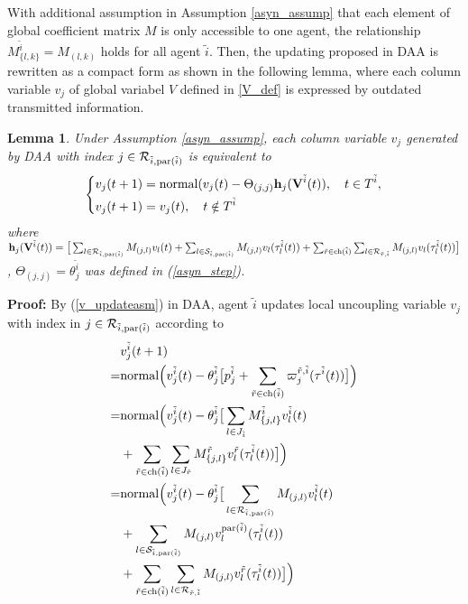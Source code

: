\documentclass[journal]{IEEEtran}
\newtheorem{lemma}{Lemma}[section]
\begin{document}
\par With additional assumption in Assumption \ref{asyn_assump} that each element of global coefficient matrix $M$ is only accessible to one agent, the relationship $M^{\tilde{i}}_{\{l,k\}}=M_{(l,k)}$ holds for all agent $\tilde{i}$. Then, the updating proposed in DAA is rewritten as a compact form as shown in the following lemma, where each column variable $v_j$ of global variabel $V$ defined in \eqref{V_def} is expressed by outdated transmitted information.
\begin{lemma}\label{asyn_comp}
	Under Assumption \ref{asyn_assump}, each column variable $v_j$ generated by DAA with index $j\in \mathcal{R}_{\tilde{i},{\rm par}(\tilde{i})}$ is equivalent to
	\begin{equation}
	\left\{
	\begin{aligned}
	&v_j(t+1)={\rm normal}(v_j(t)-\Theta_{(j,j)}\mathbf{h}_j(\mathbf{V}^{\tilde{i}}(t)), \quad t\in T^{\tilde{i}},\\
	&v_j(t+1)=v_j(t),\quad t\notin T^{\tilde{i}}
	\end{aligned}
	\right.
	\end{equation}
	where $\mathbf{h}_j(\mathbf{V}^{\tilde{i}}(t))=  \big[\sum_{l\in \mathcal{R}_{\tilde{i},{\rm par}(\tilde{i})}} M_{(j,l)} {v}_l(t)+\sum_{l\in \mathcal{S}_{\tilde{i},{\rm par}(\tilde{i})}} M_{(j,l)} {v}_l(\tau_{l}^{\tilde{i}}(t))+\sum_{\tilde{r}\in {\rm ch}(\tilde{i})}\sum_{l\in \mathcal{R}_{\tilde{r},\tilde{i}}} M_{(j,l)} v_l(\tau_{l}^{\tilde{i}}(t))\big]$, $\Theta_{(j,j)}=\theta_j^{\tilde{i}}$ was defined in (\ref{asyn_step}).
\end{lemma}
\par\textbf{Proof:}
By (\ref{v_updateasm}) in DAA, agent $\tilde{i}$ updates local uncoupling variable $v_j$ with index in $j\in \mathcal{R}_{\tilde{i},{\rm par}(\tilde{i})}$
according to
\begin{align}\label{vrasyn}
&v_j^{\tilde{i}}(t+1)\notag\\=&{\rm normal}\Big(v_j^{\tilde{i}}(t)-\theta_j^{\tilde{i}} \big[p_j^{\tilde{i}}+\sum_{\tilde{r}\in {\rm ch}(\tilde{i})}\varpi_j^{\tilde{r},\tilde{i}}(\tau^{\tilde{i}}(t))\big]\Big)\notag\\
=&{\rm normal}\Big(v_j^{\tilde{i}}(t)-\theta_j^{\tilde{i}} \big[\sum_{l\in J_{\tilde{i}}} M_{\{j,l\}}^{\tilde{i}} {v}_l^{\tilde{i}}(t)\notag\\
&+\sum_{\tilde{r}\in {\rm ch}(\tilde{i})}\sum_{l\in J_{\tilde{r}}} M_{\{j,l\}}^{\tilde{r}} v_l^{\tilde{r}}(\tau_{l}^{\tilde{i}}(t))\big]\Big)\notag\\
=&{\rm normal}\Big(v_j^{\tilde{i}}(t)-\theta_j^{\tilde{i}} \big[\sum_{l\in \mathcal{R}_{\tilde{i},{\rm par}(\tilde{i})}} M_{(j,l)} {v}_l^{\tilde{i}}(t)\notag\\
&+\sum_{l\in \mathcal{S}_{\tilde{i},{\rm par}(\tilde{i})}} M_{(j,l)} {v}_l^{{\rm par}({\tilde{i}})}(\tau_{l}^{\tilde{i}}(t))\notag\\
&+\sum_{\tilde{r}\in {\rm ch}(\tilde{i})}\sum_{l\in \mathcal{R}_{\tilde{r},\tilde{i}}} M_{(j,l)} v_l^{\tilde{r}}(\tau_{l}^{\tilde{i}}(t))\big]\Big)
\end{align}
\end{document}
